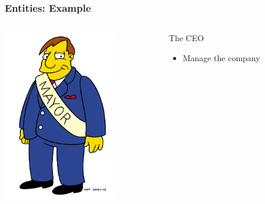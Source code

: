 \documentclass{beamer}
\begin{document}
\begin{frame}
\frametitle{Entities: Example}
\begin{columns}
 \begin{column}{0.45\textwidth}
         \includegraphics[height=7.5cm]{./pics/simpsons/mayor_Joe-Quimby.png}
 \end{column}
 \begin{column}{0.45\textwidth}
    \begin{block}{The CEO}
        \begin{itemize}
            \item Manage the company 
        \end{itemize}

    \end{block}

 \end{column}
\end{columns}
\end{frame}
\end{document}
